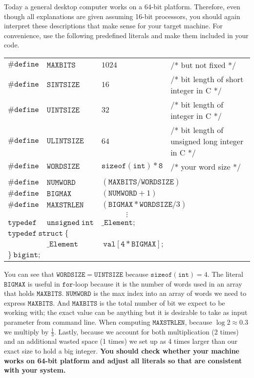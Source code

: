 \documentclass{article}
\begin{document}
Today a general desktop computer works on a 64-bit platform. Therefore, even though all explanations are given assuming 16-bit processors,
you should again interpret these descriptions that make sense for your target machine.
For convenience,  use the following predefined literals and make them included in your code.
\begin{table}[h]
\centering
\begin{tabular}{p{1.5cm}p{3cm}p{2.5cm}l}
$\mathtt{\# define}$ & $\mathtt{MAXBITS}$ & $1024$ &/* but not fixed */\\
$\mathtt{\# define}$ & $\mathtt{SINTSIZE}$ & $16$ &/* bit length of short integer in C */\\
$\mathtt{\# define}$ & $\mathtt{UINTSIZE}$ & $32$ &/* bit length of  integer in C */\\
$\mathtt{\# define}$ & $\mathtt{ULINTSIZE}$ & $64$ &/* bit length of unsigned long integer in C */\\
$\mathtt{\# define}$ & $\mathtt{WORDSIZE}$ & $\mathtt{sizeof(int)*8}$ &/* your word size */\\
\multicolumn{4}{l}{}\\
$\mathtt{\# define}$ & $\mathtt{NUMWORD}$ & \multicolumn{2}{l}{$(\mathtt{MAXBITS}/\mathtt{WORDSIZE})$}   \\
$\mathtt{\# define}$ & $\mathtt{BIGMAX}$ & \multicolumn{2}{l}{$(\mathtt{NUMWORD}+1)$}\\
$\mathtt{\# define}$ & $\mathtt{MAXSTRLEN}$ & \multicolumn{2}{l}{$(\mathtt{BIGMAX*WORDSIZE}/3)$}\\
\multicolumn{4}{c}{$\vdots$}\\
$\mathtt{typedef}$ & $\mathtt{unsigned\ int}$ &\multicolumn{2}{l}{$\mathtt{\_Element;}$}\\
\multicolumn{4}{l}{$\mathtt{typedef\ struct\ \{}$} \\
&$\mathtt{\_Element}$ & \multicolumn{2}{l}{$\mathtt{\ val[4*BIGMAX];}$}\\
\multicolumn{4}{l}{$\mathtt{\}\ bigint;}$}
\end{tabular}
\end{table}

\noindent You can see that $\mathtt{WORDSIZE}=\mathtt{UINTSIZE}$ because $\mathtt{sizeof(int)}=4$. 
The literal $\mathtt{BIGMAX}$ is useful in $\mathtt{for}$-loop because it is the number of words used in
an array that holds $\mathtt{MAXBITS}$. $\mathtt{NUMWORD}$ is the max index into an array 
of words we need to express $\mathtt{MAXBITS}$. And $\mathtt{MAXBITS}$ is the total number of 
bit we expect to be working with; the exact value can be anything but it is desirable to take as input 
parameter from command line. When computing $\mathtt{MAXSTRLEN}$, because $\log 2\approx 0.3$ we multiply by $\frac{1}{3}$.
Lastly, because we account for both multiplication (2 times) and an additional wasted space (1 times)
we set up as 4 times larger than our exact size to hold a big integer.
\textbf{You should check whether your machine works on 64-bit platform and adjust all literals so that are 
consistent with your system.}
\end{document}
